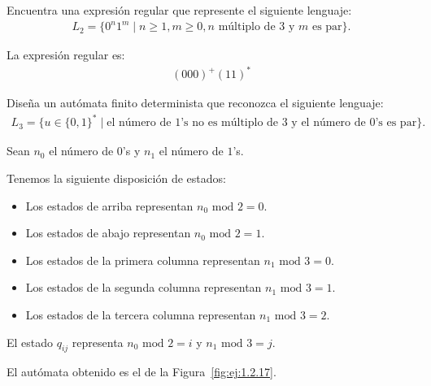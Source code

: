 \begin{ejercicio}
    Encuentra una expresión regular que represente el siguiente lenguaje:
    \begin{align*}
        L_2 = \{0^n1^m \mid n \geq 1, m \geq 0, n \text{\ múltiplo de\ } 3 \text{\ y\ } m \text{\ es par}\}.
    \end{align*}

    La expresión regular es:
    \begin{align*}
        (000)^+(11)^*
    \end{align*}
\end{ejercicio}

\begin{ejercicio} \label{ej:1.2.17}
    Diseña un autómata finito determinista que reconozca el siguiente lenguaje:
    \begin{align*}
        L_3 = \{u \in \{0, 1\}^* \mid \text{el número de $1$'s no es múltiplo de\ } 3 \text{\ y el número de $0$'s es par}\}.
    \end{align*}

    Sean $n_0$ el número de $0$'s y $n_1$ el número de $1$'s.

    Tenemos la siguiente disposición de estados:
    \begin{itemize}
        \item Los estados de arriba representan $n_0 \text{ mod } 2 = 0$.
        \item Los estados de abajo representan $n_0 \text{ mod } 2 = 1$.
        \item Los estados de la primera columna representan $n_1 \text{ mod } 3 = 0$.
        \item Los estados de la segunda columna representan $n_1 \text{ mod } 3 = 1$.
        \item Los estados de la tercera columna representan $n_1 \text{ mod } 3 = 2$.
    \end{itemize}

    El estado $q_{ij}$ representa $n_0 \text{ mod } 2 = i$ y $n_1 \text{ mod } 3 = j$.
    
    El autómata obtenido es el de la Figura~\ref{fig:ej:1.2.17}.
    \begin{figure}
        \centering
\end{figure}
\end{ejercicio}
